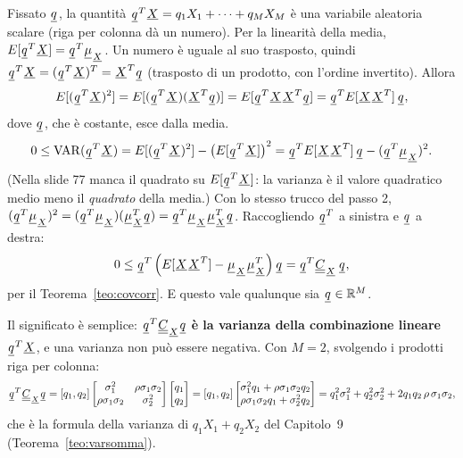 
\begin{dimostrazione}
 Fissato $\vett{q}$, la quantità $\vett{q}^T \vett{X} = q_1 X_1 + \cdots + q_M X_M$ è una
variabile aleatoria scalare (riga per colonna dà un numero). Per la linearità della media,
$E[\vett{q}^T \vett{X}] = \vett{q}^T \vett{\mu}_{\vett{X}}$.
 Un numero è uguale al suo trasposto, quindi
$\vett{q}^T \vett{X} = (\vett{q}^T \vett{X})^T = \vett{X}^T \vett{q}$ (trasposto di un prodotto, con l'ordine
invertito). Allora
\[ E[(\vett{q}^T \vett{X})^2] = E[(\vett{q}^T \vett{X})(\vett{X}^T \vett{q})] = E[\vett{q}^T \vett{X}\vett{X}^T
   \vett{q}] = \vett{q}^T E[\vett{X}\vett{X}^T]\, \vett{q} , \]
dove $\vett{q}$, che è costante, esce dalla media.
\[ 0 \leq \mathrm{VAR}(\vett{q}^T \vett{X}) = E[(\vett{q}^T \vett{X})^2] - \left( E[\vett{q}^T \vett{X}] \right)^2 =
   \vett{q}^T E[\vett{X}\vett{X}^T]\, \vett{q} - (\vett{q}^T \vett{\mu}_{\vett{X}})^2 . \]
(Nella slide 77 manca il quadrato su $E[\vett{q}^T \vett{X}]$: la varianza è il valore quadratico medio meno il
\emph{quadrato} della media.)
 Con lo stesso trucco del passo 2,
$(\vett{q}^T \vett{\mu}_{\vett{X}})^2 = (\vett{q}^T \vett{\mu}_{\vett{X}})(\vett{\mu}_{\vett{X}}^T \vett{q}) =
\vett{q}^T \vett{\mu}_{\vett{X}} \vett{\mu}_{\vett{X}}^T \vett{q}$. Raccogliendo $\vett{q}^T$ a sinistra e $\vett{q}$ a
destra:
\[ 0 \leq \vett{q}^T \left( E[\vett{X}\vett{X}^T] - \vett{\mu}_{\vett{X}} \vett{\mu}_{\vett{X}}^T \right) \vett{q} =
   \vett{q}^T \matr{C}_{\vett{X}}\, \vett{q} , \]
per il Teorema~\ref{teo:covcorr}. E questo vale qualunque sia $\vett{q} \in \R^M$.
\end{dimostrazione}

Il significato è semplice: $\vett{q}^T \matr{C}_{\vett{X}} \vett{q}$ \textbf{è la varianza della combinazione lineare}
$\vett{q}^T \vett{X}$, e una varianza non può essere negativa. Con $M = 2$, svolgendo i prodotti riga per colonna:
\[ \vett{q}^T \matr{C}_{\vett{X}} \vett{q} = [q_1, q_2] \begin{bmatrix} \sigma_1^2 & \rho\sigma_1\sigma_2 \\
   \rho\sigma_1\sigma_2 & \sigma_2^2 \end{bmatrix} \begin{bmatrix} q_1 \\ q_2 \end{bmatrix} = [q_1, q_2]
   \begin{bmatrix} \sigma_1^2 q_1 + \rho\sigma_1\sigma_2 q_2 \\ \rho\sigma_1\sigma_2 q_1 + \sigma_2^2 q_2 \end{bmatrix}
   = q_1^2 \sigma_1^2 + q_2^2 \sigma_2^2 + 2 q_1 q_2\, \rho\, \sigma_1 \sigma_2 , \]
che è la formula della varianza di $q_1 X_1 + q_2 X_2$ del Capitolo~9 (Teorema~\ref{teo:varsomma}).

